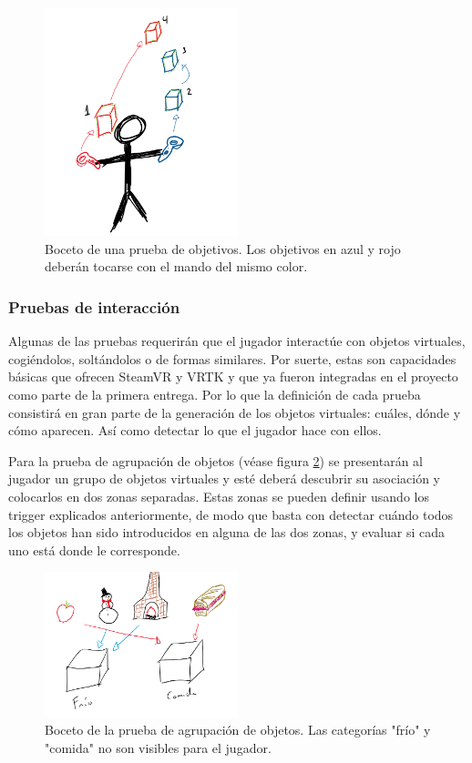 \begin{figure}
  \centering
    \includegraphics[width=0.5\textwidth]{04.Desarrollo/02.Entrega2/01.Iteracion2_1/00.Figuras/05.objetivos.png}
    \caption{Boceto de una prueba de objetivos. Los objetivos en azul y rojo deberán tocarse con el mando del mismo color.}
    \label{fig:E2_objetivos}
\end{figure}


\subsubsection{Pruebas de interacción}

Algunas de las pruebas requerirán que el jugador interactúe con objetos virtuales, cogiéndolos, soltándolos o de formas similares. Por suerte, estas son capacidades básicas que ofrecen SteamVR y VRTK y que ya fueron integradas en el proyecto como parte de la primera entrega. Por lo que la definición de cada prueba consistirá en gran parte de la generación de los objetos virtuales: cuáles, dónde y cómo aparecen. Así como detectar lo que el jugador hace con ellos.

Para la prueba de agrupación de objetos (véase figura \ref{fig:E2_agrupacion}) se presentarán al jugador un grupo de objetos virtuales y esté deberá descubrir su asociación y colocarlos en dos zonas separadas. Estas zonas se pueden definir usando los trigger explicados anteriormente, de modo que basta con detectar cuándo todos los objetos han sido introducidos en alguna de las dos zonas, y evaluar si cada uno está donde le corresponde.


\begin{figure}
  \centering
    \includegraphics[width=0.5\textwidth]{04.Desarrollo/02.Entrega2/01.Iteracion2_1/00.Figuras/06.agrupacion.png}
    \caption{Boceto de la prueba de agrupación de objetos. Las categorías "frío" y "comida" no son visibles para el jugador.}
    \label{fig:E2_agrupacion}
\end{figure}

